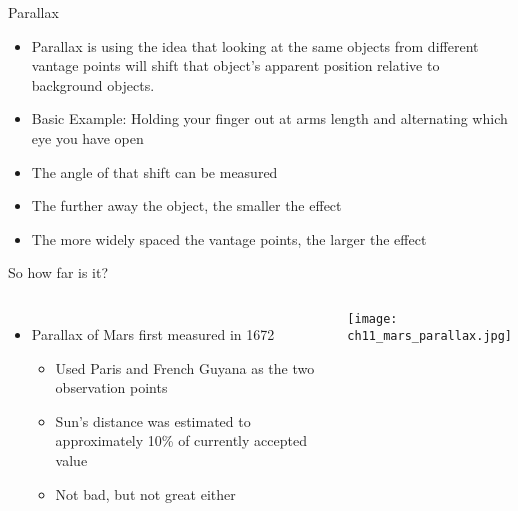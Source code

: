 \documentclass[pdf, aspectratio=169]{beamer}
\begin{document}
\begin{frame}{Parallax}
  \begin{itemize}
	\item Parallax is using the idea that looking at the same objects from different vantage points will shift that object's apparent position relative to background objects.
	\item Basic Example: Holding your finger out at arms length and alternating which eye you have open
	\item The \alert{angle} of that shift can be measured
	\item The further away the object, the smaller the effect
	\item The more widely spaced the vantage points, the larger the effect
  \end{itemize}
  \begin{center}
  \end{center}
\end{frame}

\begin{frame}{So how far is it?}
  \begin{columns}
	\begin{itemize}
	  \item Parallax of Mars first measured in 1672
		\begin{itemize}
		  \item Used Paris and French Guyana as the two observation points
		  \item Sun's distance was estimated to approximately 10\% of currently accepted value
		  \item Not bad, but not great either
		\end{itemize}
	\end{itemize}
	\begin{center}
	  \texttt{[image: ch11\_mars\_parallax.jpg]}
	\end{center}
  \end{columns}
\end{frame}
\end{document}
